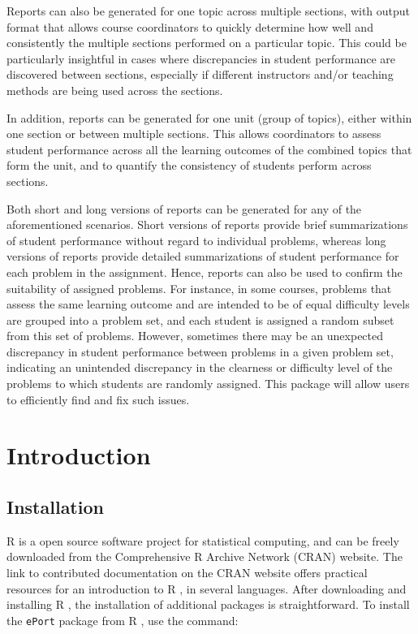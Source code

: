 \documentclass{article}
\numberwithin{equation}{section} %
\newcommand{\pkg}[1]{{\texttt{#1}}}
\newcommand{\R}{{\normalfont\textsf{R }}{}}
\begin{document}
Reports can also be generated for one topic across multiple sections, with output format that allows course coordinators to quickly determine how well and consistently the multiple sections performed on a particular topic. This could be particularly insightful in cases where discrepancies in student performance are discovered between sections, especially if different instructors and/or teaching methods are being used across the sections.

In addition, reports can be generated for one unit (group of topics), either within one section or between multiple sections. This allows coordinators to assess student performance across all the learning outcomes of the combined topics that form the unit, and to quantify the consistency of students perform across sections.

Both short and long versions of reports can be generated for any of the aforementioned scenarios. Short versions of reports provide brief summarizations of student performance without regard to individual problems, whereas long versions of reports provide detailed summarizations of student performance for each problem in the assignment. Hence, reports can also be used to confirm the suitability of assigned problems. For instance, in some courses, problems that assess the same learning outcome and are intended to be of equal difficulty levels are grouped into a problem set, and each student is assigned a random subset from this set of problems. However, sometimes there may be an unexpected discrepancy in student performance between problems in a given problem set, indicating an unintended discrepancy in the clearness or difficulty level of the problems to which students are randomly assigned. This package will allow users to efficiently find and fix such issues. 

\bigskip

\section{Introduction}

\subsection{Installation}

\R is a open source software project for statistical computing, and can be freely downloaded from the Comprehensive R Archive Network (CRAN) website. The link to contributed documentation on the CRAN website offers practical resources for an introduction to \R, in several languages. After downloading and installing \R, the installation of additional packages is straightforward. To install the \pkg{ePort} package from \R, use the command:
\end{document}
